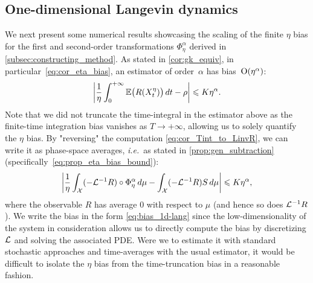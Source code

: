 \subsection{One-dimensional Langevin dynamics}
\label{subsec:num_1D}
%
%
%
We next present some numerical results showcasing the scaling of the finite $\eta$ bias for the first and second-order transformations $\Phi_\eta^\alpha$ derived in \cref{subsec:constructing_method}. As stated in \cref{cor:gk_equiv}, in particular~\eqref{eq:cor_eta_bias}, an estimator of order~$\alpha$ has bias~$\bigO(\eta^\alpha)$: 
%
\begin{equation}
	\abs*{\frac{1}{\eta}\int_0^{+\infty} \E\bigl(R(X^\eta_t)\bigr) \, dt - \rho} \leq K \eta^{\alpha}.
\end{equation}
%
Note that we did not truncate the time-integral in the estimator above as the finite-time integration bias vanishes as $T\to+\infty$, allowing us to solely quantify the $\eta$ bias. By "reversing" the computation \eqref{eq:cor_Tint_to_LinvR}, we can write it as phase-space averages, \emph{i.e.}\ as stated in \cref{prop:gen_subtraction} (specifically~\eqref{eq:prop_eta_bias_bound}): 
%
\begin{equation}
    \abs*{\frac{1}{\eta}\int_\mathcal{X} (-\L^{-1}R) \circ \Phi_\eta^\alpha \, d\mu - \int_\mathcal{X} (-\L^{-1}R) S \, d\mu} \leq K\eta^{\alpha},
    \label{eq:bias_1d-lang}
\end{equation}
%
where the observable $R$ has average 0 with respect to $\mu$ (and hence so does $\L^{-1}R$). We write the bias in the form \eqref{eq:bias_1d-lang} since the low-dimensionality of the system in consideration allows us to directly compute the bias by discretizing $\L$ and solving the associated PDE. Were we to estimate it with standard stochastic approaches and time-averages with the usual estimator, it would be difficult to isolate the $\eta$ bias from the time-truncation bias in a reasonable fashion.

